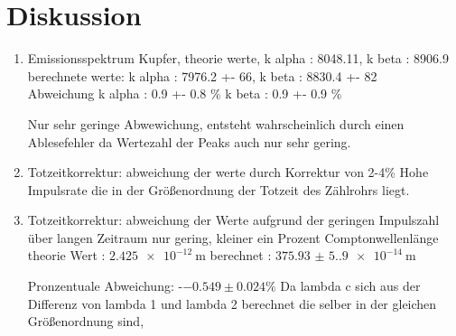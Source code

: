 \section{Diskussion}
    \begin{enumerate}
        \item Emissionsspektrum Kupfer, theorie werte,      k alpha : 8048.11,      k beta : 8906.9\\
                                        berechnete werte:   k alpha : 7976.2 +- 66, k beta : 8830.4 +- 82\\
                                        Abweichung          k alpha : 0.9 +- 0.8 \% k beta : 0.9 +- 0.9 \%

        Nur sehr geringe Abwewichung, entsteht wahrscheinlich durch einen Ablesefehler da Wertezahl der Peaks auch nur sehr gering.

        \item Totzeitkorrektur: abweichung der werte durch Korrektur von 2-4\% 
                                Hohe Impulsrate die in der Größenordnung der Totzeit des Zählrohrs liegt.

        \item Totzeitkorrektur: abweichung der Werte aufgrund der geringen Impulszahl über langen Zeitraum nur gering, kleiner ein Prozent
                Comptonwellenlänge theorie Wert : $\SI{2.425e-12}{\meter}$ berechnet : $\SI{375.93(5.9)e-14}{\meter}$

                                 Pronzentuale Abweichung: -$-0.549 \pm 0.024 \%$
                                 Da lambda c sich aus der Differenz von lambda 1 und lambda 2 berechnet die selber in der gleichen Größenordnung 
                                 sind,  
        
    \end{enumerate}